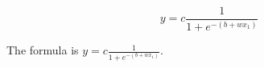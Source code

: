 \documentclass[11pt]{article}
\begin{document}
    $$ y = c \frac{1}{1 + e^{-(b + wx_1)}} $$

    The formula is $y = c \frac{1}{1 + e^{-(b + wx_1)}}$.
\end{document}
